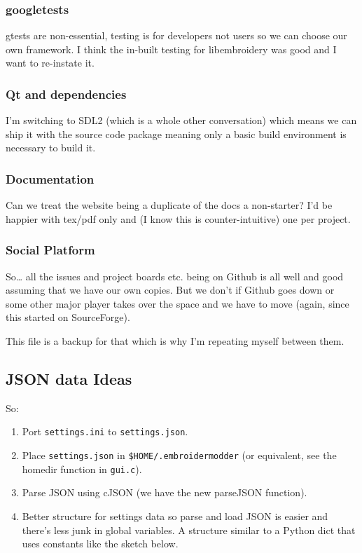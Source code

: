 \documentclass[a4paper, 11pt]{report}
\begin{document}
\subsubsection{googletests}
\label{googletests-1}

gtests are non-essential, testing is for developers not users so we can
choose our own framework. I think the in-built testing for libembroidery
was good and I want to re-instate it.

\hypertarget{qt-and-dependencies-1}{%
\subsubsection{Qt and dependencies}\label{qt-and-dependencies-1}}

I'm switching to SDL2 (which is a whole other conversation) which means
we can ship it with the source code package meaning only a basic build
environment is necessary to build it.

\hypertarget{documentation-1}{%
\subsubsection{Documentation}\label{documentation-1}}

Can we treat the website being a duplicate of the docs a non-starter?
I'd be happier with tex/pdf only and (I know this is counter-intuitive)
one per project.

\hypertarget{social-platform-1}{%
\subsubsection{Social Platform}\label{social-platform-1}}

So\ldots{} all the issues and project boards etc. being on Github is all
well and good assuming that we have our own copies. But we don't if
Github goes down or some other major player takes over the space and we
have to move (again, since this started on SourceForge).

This file is a backup for that which is why I'm repeating myself between
them.

\hypertarget{json-data-ideas-1}{%
\subsection{JSON data Ideas}\label{json-data-ideas-1}}

So:

\begin{enumerate}
\def\labelenumi{\arabic{enumi}.}
\item
  Port \texttt{settings.ini} to \texttt{settings.json}.
\item
  Place \texttt{settings.json} in \texttt{\$HOME/.embroidermodder} (or
  equivalent, see the homedir function in \texttt{gui.c}).
\item
  Parse JSON using cJSON (we have the new parseJSON function).
\item
  Better structure for settings data so parse and load JSON is easier
  and there's less junk in global variables. A structure similar to a
  Python dict that uses constants like the sketch below.
\end{enumerate}
\end{document}
